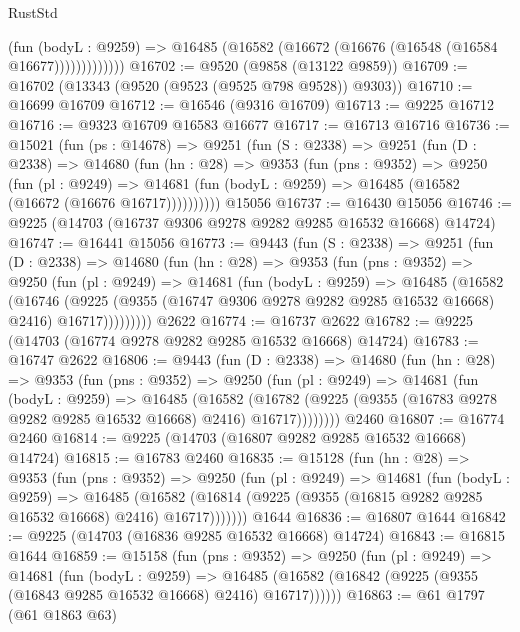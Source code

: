 \begin{lexlean}{RustStd}
\begin{coremodule}
                  (fun (bodyL : @9259) =>
                  @16485 (@16582 (@16672 (@16676 (@16548 (@16584 @16677)))))))))))))
@16702 := @9520 (@9858 (@13122 @9859))
@16709 := @16702 (@13343 (@9520 (@9523 (@9525 @798 @9528)) @9303))
@16710 := @16699 @16709
@16712 := @16546 (@9316 @16709)
@16713 := @9225 @16712
@16716 := @9323 @16709 @16583 @16677
@16717 := @16713 @16716
@16736 := @15021
    (fun (ps : @14678) =>
    @9251
      (fun (S : @2338) =>
      @9251
        (fun (D : @2338) =>
        @14680
          (fun (hn : @28) =>
          @9353
            (fun (pns : @9352) =>
            @9250
              (fun (pl : @9249) =>
              @14681 (fun (bodyL : @9259) => @16485 (@16582 (@16672 (@16676 @16717))))))))))
    @15056
@16737 := @16430 @15056
@16746 := @9225 (@14703 (@16737 @9306 @9278 @9282 @9285 @16532 @16668) @14724)
@16747 := @16441 @15056
@16773 := @9443
    (fun (S : @2338) =>
    @9251
      (fun (D : @2338) =>
      @14680
        (fun (hn : @28) =>
        @9353
          (fun (pns : @9352) =>
          @9250
            (fun (pl : @9249) =>
            @14681
              (fun (bodyL : @9259) =>
              @16485
                (@16582
                  (@16746
                    (@9225
                      (@9355 (@16747 @9306 @9278 @9282 @9285 @16532 @16668) @2416)
                      @16717)))))))))
    @2622
@16774 := @16737 @2622
@16782 := @9225 (@14703 (@16774 @9278 @9282 @9285 @16532 @16668) @14724)
@16783 := @16747 @2622
@16806 := @9443
    (fun (D : @2338) =>
    @14680
      (fun (hn : @28) =>
      @9353
        (fun (pns : @9352) =>
        @9250
          (fun (pl : @9249) =>
          @14681
            (fun (bodyL : @9259) =>
            @16485
              (@16582
                (@16782 (@9225 (@9355 (@16783 @9278 @9282 @9285 @16532 @16668) @2416) @16717))))))))
    @2460
@16807 := @16774 @2460
@16814 := @9225 (@14703 (@16807 @9282 @9285 @16532 @16668) @14724)
@16815 := @16783 @2460
@16835 := @15128
    (fun (hn : @28) =>
    @9353
      (fun (pns : @9352) =>
      @9250
        (fun (pl : @9249) =>
        @14681
          (fun (bodyL : @9259) =>
          @16485
            (@16582 (@16814 (@9225 (@9355 (@16815 @9282 @9285 @16532 @16668) @2416) @16717)))))))
    @1644
@16836 := @16807 @1644
@16842 := @9225 (@14703 (@16836 @9285 @16532 @16668) @14724)
@16843 := @16815 @1644
@16859 := @15158
    (fun (pns : @9352) =>
    @9250
      (fun (pl : @9249) =>
      @14681
        (fun (bodyL : @9259) =>
        @16485 (@16582 (@16842 (@9225 (@9355 (@16843 @9285 @16532 @16668) @2416) @16717))))))
@16863 := @61 @1797 (@61 @1863 @63)

\end{coremodule}
\end{lexlean}
